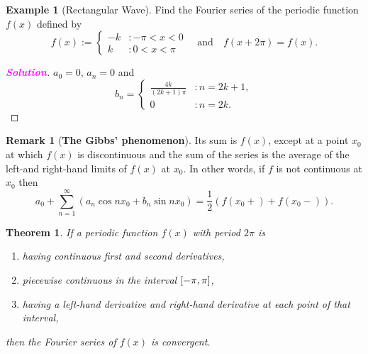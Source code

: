 \documentclass[12pt,openany]{book}
\newtheorem{theorem}{Theorem}[chapter]
\theoremstyle{definition}
\newtheorem{remark}{Remark}[chapter]
\newtheorem{example}{Example}[chapter]
\newcommand{\of}[1]{\left( #1 \right)}
\newcommand{\sol}{\textcolor{magenta}{\bf Solution}}
\begin{document}
	\begin{example}[Rectangular Wave]
		Find the Fourier series of the periodic function $f(x)$ defined by \[
		f(x):=\begin{cases}
			-k&:-\pi<x<0\\ k&:0<x<\pi
		\end{cases}\quad\text{and}\quad f(x+2\pi)=f(x).
		\]
		\begin{proof}[\sol]
			$a_0=0$, $a_n=0$ and \[
			b_n=\begin{cases}
				\displaystyle\frac{4k}{(2k+1)\pi} &:n=2k+1,\\
				0 &:n=2k.
			\end{cases}
			\]
		\end{proof}
	\end{example}
	\vspace{20pt}
	\begin{remark}[\bf The Gibbs’ phenomenon]
		Its sum is $f(x)$, except at a point $x_0$ at which $f(x)$ is discontinuous and the sum of
		the series is the average of the left-and right-hand limits of $f(x)$ at $x_0$. In other words, if $f$ is not continuous at $x_0$ then \[
		a_0+\sum_{n=1}^\infty(a_n\cos nx_0+b_n\sin nx_0)=\frac{1}{2}\of{f(x_0+)+f(x_0-)}.
		\]
	\end{remark}
	\newpage
	\begin{tcolorbox}[colframe=thmcolor, title={\color{white}\bf Representation by a Fourier series}]
		\begin{theorem}
			If a periodic function $f(x)$ with period $2\pi$ is
			\begin{enumerate}[(1)]
				\item having continuous first and second derivatives,
				\item piecewise continuous in the interval $\intcc{-\pi, \pi}$,
				\item having a left-hand derivative and right-hand derivative at each point of that
				interval,
			\end{enumerate}
			then the Fourier series of $f(x)$ is convergent.
		\end{theorem}
	\end{tcolorbox}
\end{document}
